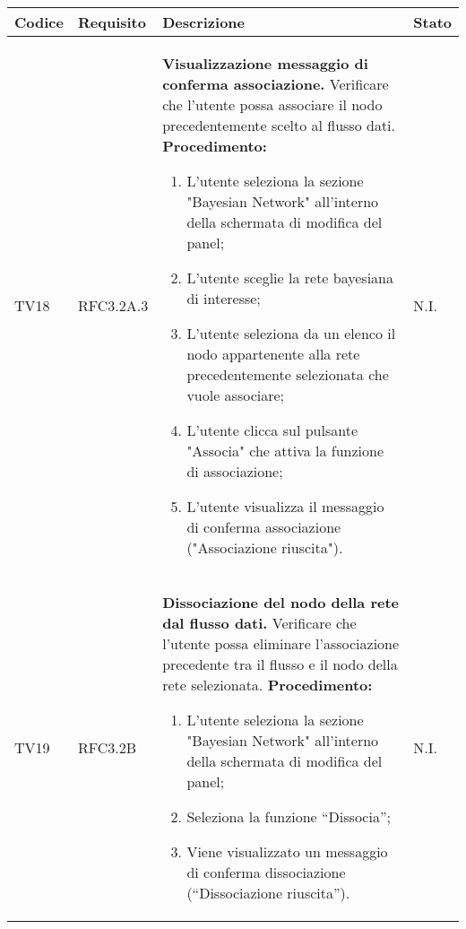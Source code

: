 \begin{table}[!htpb]
	\centering
	\renewcommand{\arraystretch}{2} 
	\begin{tabular}{|l|l|p{10cm}|l|}
		\rowcolor{orange!50}
		\hline
		\textbf{Codice} & \textbf{Requisito}& \textbf{Descrizione} & \textbf{Stato}\\ 
		\hline
		TV18 & RFC3.2A.3 &
			\textbf{Visualizzazione messaggio di conferma associazione.}
			\newline
			Verificare che l'utente possa associare il nodo precedentemente scelto al flusso dati.
			\newline
			\textbf{Procedimento:}
			\begin{enumerate}
				\item L’utente seleziona la sezione "Bayesian Network" all'interno della schermata di modifica del panel; 
				\item L'utente sceglie la rete bayesiana di interesse;
				\item L’utente seleziona da un elenco il nodo appartenente alla rete precedentemente selezionata che vuole associare;
				\item L’utente clicca sul pulsante "Associa" che attiva la funzione di associazione;
				\item L’utente visualizza il messaggio di conferma associazione ("Associazione riuscita").
			\end{enumerate} 
			& N.I.\\
		\hline
		TV19 & RFC3.2B &
			\textbf{Dissociazione del nodo della rete dal flusso dati.} 
			\newline
			Verificare che l’utente possa eliminare l'associazione precedente tra il flusso e il nodo della rete selezionata. 
			\newline 
			\textbf{Procedimento:} 
			\begin{enumerate} 
				\item L’utente seleziona la sezione "Bayesian Network" all'interno della schermata di modifica del panel;
				\item Seleziona la funzione “Dissocia”; 
				\item Viene visualizzato un messaggio di conferma dissociazione (“Dissociazione riuscita”).		
			\end{enumerate} 
			& N.I.\\
		\hline
	\end{tabular}
\end{table}
